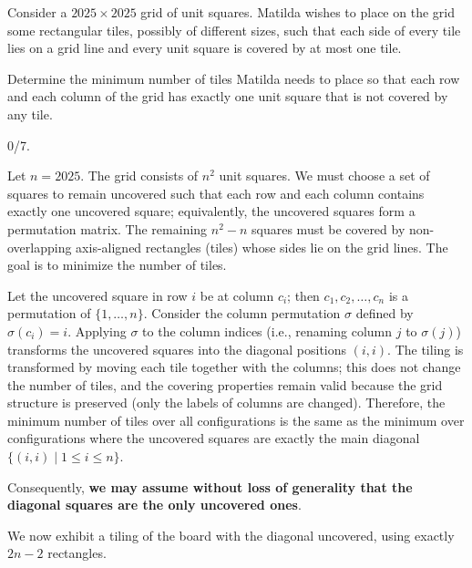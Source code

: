 \begin{mdframed}[style=mdpurplebox,frametitle={IMO 2025 Problem 6}]
Consider a $2025 \times 2025$ grid of unit squares.
Matilda wishes to place on the grid some rectangular tiles, possibly of different sizes,
such that each side of every tile lies on a grid line
and every unit square is covered by at most one tile.

Determine the minimum number of tiles Matilda needs to place
so that each row and each column of the grid has exactly one unit square
that is not covered by any tile.
\end{mdframed}
\begin{remark*}
  0/7.
\end{remark*}
Let \(n = 2025\). The grid consists of \(n^2\) unit squares. We must choose a set of squares to remain uncovered such that each row and each column contains exactly one uncovered square; equivalently, the uncovered squares form a permutation matrix. The remaining \(n^2 - n\) squares must be covered by non-overlapping axis-aligned rectangles (tiles) whose sides lie on the grid lines. The goal is to minimize the number of tiles.\par
\smallskip
{}
Let the uncovered square in row \(i\) be at column \(c_i\); then \(c_1, c_2, \dots, c_n\) is a permutation of \(\{1,\dots,n\}\). Consider the column permutation \(\sigma\) defined by \(\sigma(c_i) = i\). Applying \(\sigma\) to the column indices (i.e., renaming column \(j\) to \(\sigma(j)\)) transforms the uncovered squares into the diagonal positions \((i,i)\). The tiling is transformed by moving each tile together with the columns; this does not change the number of tiles, and the covering properties remain valid because the grid structure is preserved (only the labels of columns are changed). Therefore, the minimum number of tiles over all configurations is the same as the minimum over configurations where the uncovered squares are exactly the main diagonal \(\{(i,i) \mid 1\le i\le n\}\).\par
Consequently, \textbf{we may assume without loss of generality that the diagonal squares are the only uncovered ones}.\par
\smallskip
{}
We now exhibit a tiling of the board with the diagonal uncovered, using exactly \(2n-2\) rectangles.\par
{}
